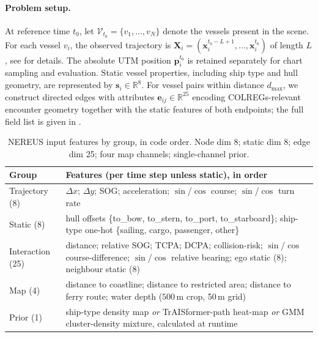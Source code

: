 \documentclass[runningheads]{preamp/llncs}
\begin{document}
\paragraph{Problem setup.}
At reference time $t_0$,
let $\mathcal{V}_{t_0}=\{v_1,\dots,v_N\}$
denote the vessels present in the scene.
For each vessel $v_i$,
the observed trajectory is $\mathbf{X}_i=(\mathbf{x}_i^{t_0-L+1},\dots,\mathbf{x}_i^{t_0})$
of length $L$, see  for details.
%
The absolute \acs{UTM} position $\mathbf{p}_i^{t_0}$ is retained separately
for chart sampling and evaluation.
%
Static vessel properties,
including ship type and hull geometry, are represented by $\mathbf{s}_i\in\mathbb{R}^{8}$.
%
For vessel pairs within distance $d_{\max}$,
we construct directed edges with attributes $\mathbf{e}_{ij}\in\mathbb{R}^{25}$
%
encoding \ac{COLREGs}-relevant encounter geometry
together with the static features of both endpoints;
the full field list is given in .

\begin{table}[H]
    \caption{NEREUS input features by group, in code order.
    Node dim 8; static dim 8; edge dim 25; four map channels; single-channel prior.}
    \label{tab:features}
    \centering\small
    \setlength{\tabcolsep}{6pt}
    \begin{tabular}{p{2.5cm}p{8.5cm}}
        \toprule
        Group & Features (per time step unless static), in order \\
        \midrule
        Trajectory (8) & $\Delta x$; $\Delta y$; SOG; acceleration;
        $\sin$/$\cos$ course; $\sin$/$\cos$ turn rate \\
        Static (8) & hull offsets \{to\_bow, to\_stern, to\_port, to\_starboard\};
        ship-type one-hot \{sailing, cargo, passenger, other\} \\
        Interaction (25) & distance; relative SOG; \acs{TCPA}; \acs{DCPA};
        collision-risk; $\sin$/$\cos$ course-difference; $\sin$/$\cos$ relative bearing;
        ego static (8); neighbour static (8) \\
        Map (4) & distance to coastline; distance to restricted area; distance to ferry
        route; water depth ($500\,$m crop, 50\,m grid) \\
        Prior (1) & ship-type density map \emph{or} TrAISformer-path heat-map \emph{or}
        \acs{GMM} cluster-density mixture, calculated at runtime \\
        \bottomrule
    \end{tabular}
\end{table}
\end{document}
